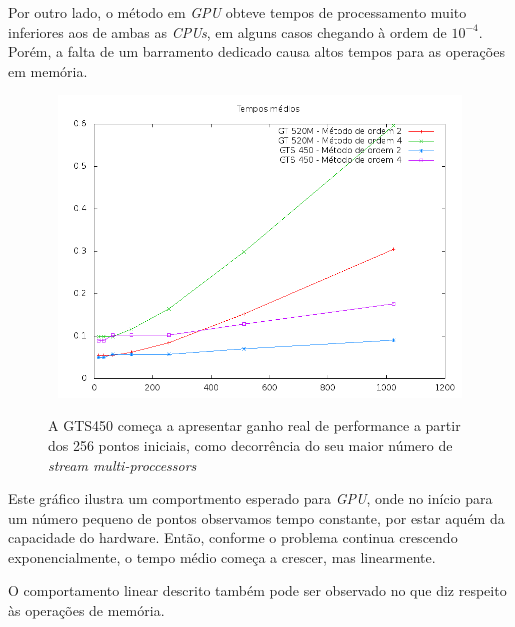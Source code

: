   Por outro lado, o método em \textit{GPU} obteve tempos de processamento muito inferiores aos de ambas as \textit{CPUs}, em alguns casos chegando à ordem de $10^{-4}$. Porém, a falta de um barramento dedicado causa altos tempos para as operações em memória.
  
  \begin{figure}[!h]
    \begin{center}
       \includegraphics[width=120mm, height=80mm]{images/gpu-means-double.png}
       \label{fig:gpu-means-double}
       \caption{A GTS450 começa a apresentar ganho real de performance a partir dos 256 pontos iniciais, como decorrência do seu maior número de \textit{stream multi-proccessors}}
    \end{center}
  \end{figure}
  
  Este gráfico ilustra um comportmento esperado para \textit{GPU}, onde no início para um número pequeno de pontos observamos tempo constante, por estar aquém da capacidade do hardware. Então, conforme o problema continua crescendo exponencialmente, o tempo médio começa a crescer, mas linearmente.
  
  \newpage
  O comportamento linear descrito também pode ser observado no que diz respeito às operações de memória.
  
